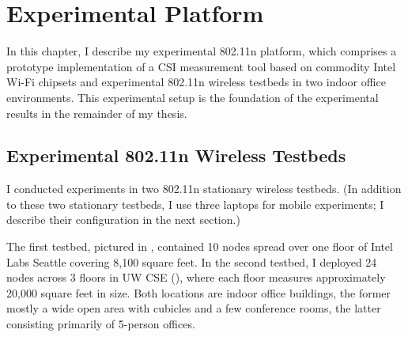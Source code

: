 \ifx\mainfile\undefined

\setcounter{chapter}{4} %
\fi

\cleardoublepage
\chapter{Experimental Platform}
\label{chap:tool}

In this chapter, I describe my experimental 802.11n platform, which comprises a prototype implementation of a CSI measurement tool based on commodity Intel Wi-Fi chipsets and experimental 802.11n wireless testbeds in two indoor office environments. This experimental setup is the foundation of the experimental results in the remainder of my thesis.

\section{Experimental 802.11n Wireless Testbeds}
I conducted experiments in two 802.11n stationary wireless testbeds. (In addition to these two stationary testbeds, I use three laptops for mobile experiments; I describe their configuration in the next section.)

The first testbed, pictured in , contained 10 nodes spread over one floor of Intel Labs Seattle covering 8,100 square feet. In the second testbed, I deployed 24 nodes across 3 floors in UW CSE (), where each floor measures approximately 20,000 square feet in size. Both locations are indoor office buildings, the former mostly a wide open area with cubicles and a few conference rooms, the latter consisting primarily of 5-person offices.

